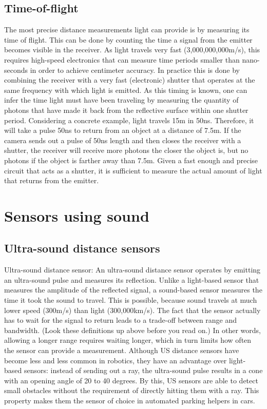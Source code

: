 \subsection{Time-of-flight}
The most precise distance measurements light can provide is by measuring its time of flight. This can be done by counting the time a signal from the emitter becomes visible in the receiver. As light travels very fast (3,000,000,000m/s), this requires high-speed electronics that can measure time periods smaller than nano-seconds in order to achieve centimeter accuracy. In practice this is done by combining the receiver with a very fast (electronic) shutter that operates at the same frequency with which light is emitted. As this timing is known, one can infer the time light must have been traveling by measuring the quantity of photons that have made it back from the reflective surface within one shutter period. Considering a concrete example, light travels 15m in 50ns. Therefore, it will take a pulse 50ns to return from an object at a distance of 7.5m. If the camera sends out a pulse of 50ns length and then closes the receiver with a shutter, the receiver will receive more photons the closer the object is, but no photons if the object is farther away than 7.5m. Given a fast enough and precise circuit that acts as a shutter, it is sufficient to measure the actual amount of light that returns from the emitter.

\section{Sensors using sound}
\subsection{Ultra-sound distance sensors}
Ultra-sound distance sensor: An ultra-sound distance sensor operates by emitting an ultra-sound pulse and measures its reflection. Unlike a light-based sensor that measures the amplitude of the reflected signal, a sound-based sensor measures the time it took the sound to travel. This is possible, because sound travels at much lower speed (300m/s) than light (300,000km/s). The fact that the sensor actually has to wait for the signal to return leads to a trade-off between range and bandwidth. (Look these definitions up above before you read on.) In other words, allowing a longer range requires waiting longer, which in turn limits how often the sensor can provide a measurement. Although US distance sensors have become less and less common in robotics, they have an advantage over light-based sensors: instead of sending out a ray, the ultra-sound pulse results in a cone with an opening angle of 20 to 40 degrees. By this, US sensors are able to detect small obstacles without the requirement of directly hitting them with a ray. This property makes them the sensor of choice in automated parking helpers in cars.


